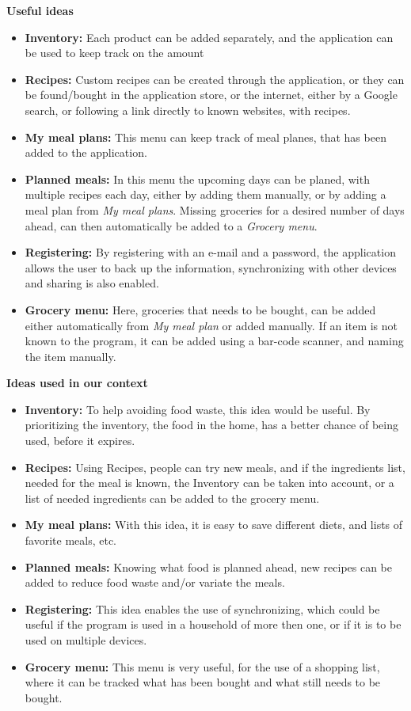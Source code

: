 \textbf{Useful ideas}
\begin{itemize}
  \item \textbf{Inventory:} Each product can be added separately, and the application can be used to keep track on the amount
  \item \textbf{Recipes:} Custom recipes can be created through the application, or they can be found/bought in the application store, or the internet, either by a Google search, or following a link directly to known websites, with recipes.
  \item \textbf{My meal plans:} This menu can keep track of meal planes, that has been added to the application.
  \item \textbf{Planned meals:} In this menu the upcoming days can be planed, with multiple recipes each day, either by adding them manually, or by adding a meal plan from \textit{My meal plans}. Missing groceries for a desired  number of days ahead, can then automatically be added to a \textit{Grocery menu}.
  \item \textbf{Registering:} By registering with an e-mail and a password, the application allows the user to back up the information, synchronizing with other devices and sharing is also enabled.
  \item \textbf{Grocery menu:} Here, groceries that needs to be bought, can be added either automatically from \textit{My meal plan} or added manually. If an item is not known to the program, it can be added using a bar-code scanner, and naming the item manually.
\end{itemize}

\textbf{Ideas used in our context}
\begin{itemize}
  \item \textbf{Inventory:} To help avoiding food waste, this idea would be useful. By prioritizing the inventory, the food in the home, has a better chance of being used, before it expires.
  \item \textbf{Recipes:} Using Recipes, people can try new meals, and if the ingredients list, needed for the meal is known, the Inventory can be taken into account, or a list of needed ingredients can be added to the grocery menu.
  \item \textbf{My meal plans:} With this idea, it is easy to save different diets, and lists of favorite meals, etc.
  \item \textbf{Planned meals:} Knowing what food is planned ahead, new recipes can be added to reduce food waste and/or variate the meals.
  \item \textbf{Registering:} This idea enables the use of synchronizing, which could be useful if the program is used in a household of more then one, or if it is to be used on multiple devices.
  \item \textbf{Grocery menu:} This menu is very useful, for the use of a shopping list, where it can be tracked what has been bought and what still needs to be bought.
\end{itemize}

